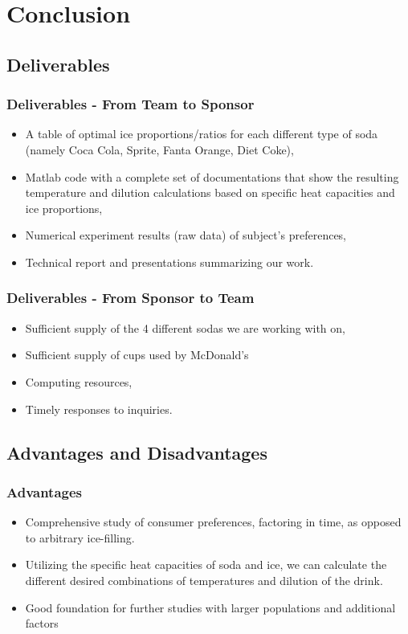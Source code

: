 \documentclass[compress,handout,10pt]{beamer}
\let\olditem\item
\renewcommand{\item}{\setlength{\itemsep}{0.5\baselineskip}\olditem}
\begin{document}

\section{Conclusion}
\subsection{Deliverables}
\begin{frame}
    \frametitle{Deliverables - From Team to Sponsor}


\begin{itemize}
    \item A table of optimal ice proportions/ratios for each different type of soda (namely Coca Cola, Sprite, Fanta Orange, Diet Coke),
    \item Matlab code with a complete set of documentations that show the resulting temperature and dilution calculations based on specific heat capacities and ice proportions,
    \item Numerical experiment results (raw data) of subject's preferences,
    \item Technical report and presentations summarizing our work. 
\end{itemize}


\end{frame}

\begin{frame}
    \frametitle{Deliverables - From Sponsor to Team}

\begin{itemize}
    \item Sufficient supply of the 4 different sodas we are working with on,
\item Sufficient supply of cups used by McDonald's
    \item Computing resources,
    \item Timely responses to inquiries.
\end{itemize}
\end{frame}

\subsection{Advantages and Disadvantages}

\begin{frame}
    \frametitle{Advantages}

\begin {itemize}
\item Comprehensive study of consumer preferences, factoring in time, as opposed to arbitrary ice-filling.
\item Utilizing the specific heat capacities of soda and ice, we can calculate the different desired combinations of temperatures and dilution of the drink.
\item Good foundation for further studies with larger populations and additional factors
\end{itemize}

\end{frame}
\end{document}
